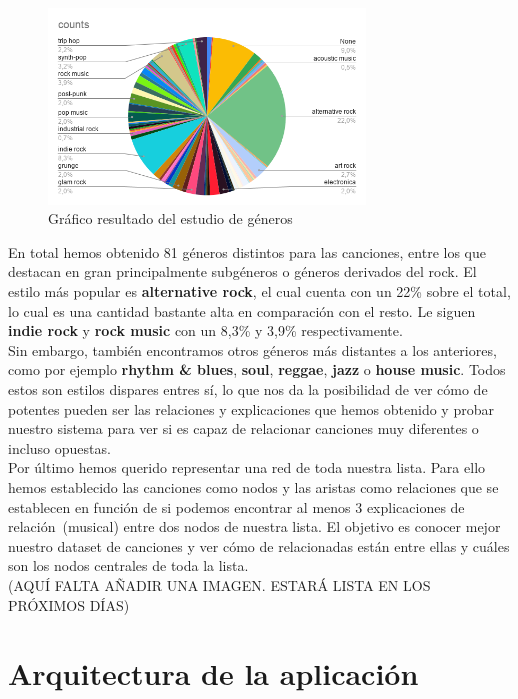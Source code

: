 \begin{figure}[h!]
	\centering
	\includegraphics[width = 0.75\textwidth]{Imagenes/Bitmap/estudioGeneros.png}
	\caption{Gráfico resultado del estudio de géneros}
	\label{fig:sampleImage}
\end{figure}

En total hemos obtenido 81 géneros distintos para las canciones, entre los que destacan en gran principalmente subgéneros o géneros derivados del rock. El estilo más popular es \textbf{alternative rock}, el cual cuenta con un 22\% sobre el total, lo cual es una cantidad bastante alta en comparación con el resto. Le siguen \textbf{indie rock} y \textbf{rock music} con un 8,3\% y 3,9\% respectivamente.\\

Sin embargo, también encontramos otros géneros más distantes a los anteriores, como por ejemplo \textbf{rhythm \& blues}, \textbf{soul}, \textbf{reggae}, \textbf{jazz} o \textbf{house music}. Todos estos son estilos dispares entres sí, lo que nos da la posibilidad de ver cómo de potentes pueden ser las relaciones y explicaciones que hemos obtenido y probar nuestro sistema para ver si es capaz de relacionar canciones muy diferentes o incluso opuestas.\\

Por último hemos querido representar una red de toda nuestra lista. Para ello hemos establecido las canciones como nodos y las aristas como relaciones que se establecen en función de si podemos encontrar al menos 3 explicaciones de relación~(musical) entre dos nodos de nuestra lista. El objetivo es conocer mejor nuestro dataset de canciones y ver cómo de relacionadas están entre ellas y cuáles son los nodos centrales de toda la lista.\\

(AQUÍ FALTA AÑADIR UNA IMAGEN. ESTARÁ LISTA EN LOS PRÓXIMOS DÍAS)

\section{Arquitectura de la aplicación}

